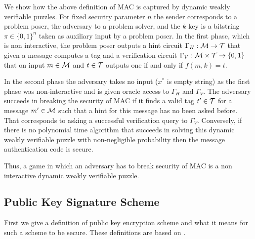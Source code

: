 \documentclass[11pt,a4paper,titlepage]{memoir}
\begin{document}
We show how the above definition of MAC is captured by dynamic weakly verifiable puzzles.
For fixed security parameter $n$ the sender corresponds to a problem poser, the adversary to a problem solver, and
the $k$ key is a bitstring $\pi \in \{0,1\}^{n}$ taken as auxiliary input by a problem poser.
In the first phase, which is non interactive, the problem poser outputs a hint circuit
$\Gamma_H: \mathcal{M} \rightarrow \mathcal{T}$ that given a message computes a tag
and a verification circuit $\Gamma_V: \mathcal{M} \times \mathcal{T} \rightarrow \{0,1\}$ that on input $m \in \mathcal{M}$ and $t \in \mathcal{T}$
outputs one if and only if $f(m, k) = t$.

In the second phase the adversary takes no input ($x^*$ is empty string) as the first phase was non-interactive and
is given oracle access to $\Gamma_H$ and $\Gamma_V$.
The adversary succeeds in breaking the security of MAC if it finds a valid tag $t' \in \mathcal{T}$ for a message $m' \in \mathcal{M}$ such that a hint for this message
has no been asked before. That corresponds to asking a successful verification query to $\Gamma_V$.
Conversely, if there is no polynomial time algorithm that succeeds in solving this dynamic weakly verifiable puzzle with non-negligible probability
then the message authentication code is secure.

Thus, a game in which an adversary has to break security of MAC is a non interactive dynamic weakly verifiable puzzle.
%
\subsection{Public Key Signature Scheme}
First we give a definition of public key encryption scheme and what it means for such a scheme to be secure.
These definitions are based on \cite{Goldreich:2004:FCV:975541}.
\end{document}
